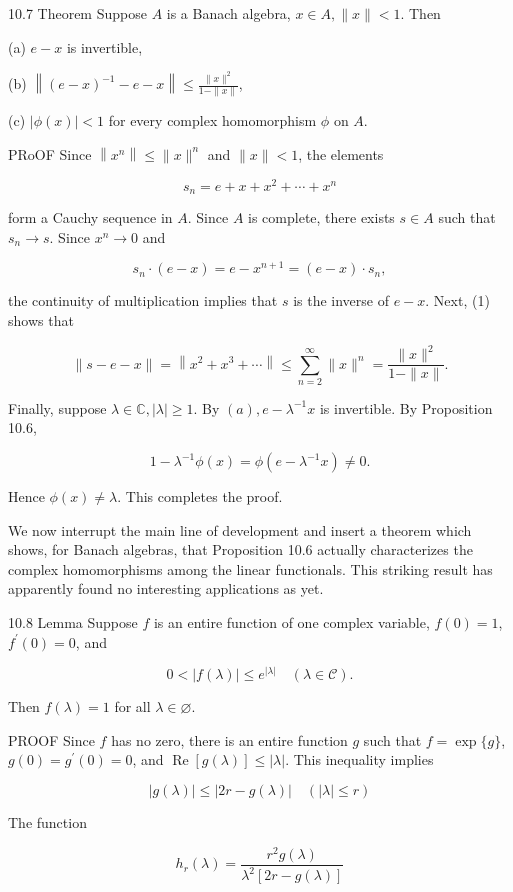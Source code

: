 \documentclass[10pt]{article}
\begin{document}
10.7 Theorem Suppose $A$ is a Banach algebra, $x \in A,\|x\|<1$. Then

(a) $e-x$ is invertible,

(b) $\left\|(e-x)^{-1}-e-x\right\| \leq \frac{\|x\|^{2}}{1-\|x\|}$,

(c) $|\phi(x)|<1$ for every complex homomorphism $\phi$ on $A$.

PRoOF Since $\left\|x^{n}\right\| \leq\|x\|^{n}$ and $\|x\|<1$, the elements

$$
s_{n}=e+x+x^{2}+\cdots+x^{n}
$$

form a Cauchy sequence in $A$. Since $A$ is complete, there exists $s \in A$ such that $s_{n} \rightarrow s$. Since $x^{n} \rightarrow 0$ and

$$
s_{n} \cdot(e-x)=e-x^{n+1}=(e-x) \cdot s_{n},
$$

the continuity of multiplication implies that $s$ is the inverse of $e-x$. Next, (1) shows that

$$
\|s-e-x\|=\left\|x^{2}+x^{3}+\cdots\right\| \leq \sum_{n=2}^{\infty}\|x\|^{n}=\frac{\|x\|^{2}}{1-\|x\|} .
$$

Finally, suppose $\lambda \in \mathbb{C},|\lambda| \geq 1$. By $(a), e-\lambda^{-1} x$ is invertible. By Proposition 10.6,

$$
1-\lambda^{-1} \phi(x)=\phi\left(e-\lambda^{-1} x\right) \neq 0 .
$$

Hence $\phi(x) \neq \lambda$. This completes the proof.

We now interrupt the main line of development and insert a theorem which shows, for Banach algebras, that Proposition 10.6 actually characterizes the complex homomorphisms among the linear functionals. This striking result has apparently found no interesting applications as yet.

10.8 Lemma Suppose $f$ is an entire function of one complex variable, $f(0)=1$, $f^{\prime}(0)=0$, and

$$
0<|f(\lambda)| \leq e^{|\lambda|} \quad(\lambda \in \mathscr{C}) .
$$

Then $f(\lambda)=1$ for all $\lambda \in \varnothing$.

PROOF Since $f$ has no zero, there is an entire function $g$ such that $f=\exp \{g\}$, $g(0)=g^{\prime}(0)=0$, and $\operatorname{Re}[g(\lambda)] \leq|\lambda|$. This inequality implies

$$
|g(\lambda)| \leq|2 r-g(\lambda)| \quad(|\lambda| \leq r)
$$

The function

$$
h_{r}(\lambda)=\frac{r^{2} g(\lambda)}{\lambda^{2}[2 r-g(\lambda)]}
$$
\end{document}
